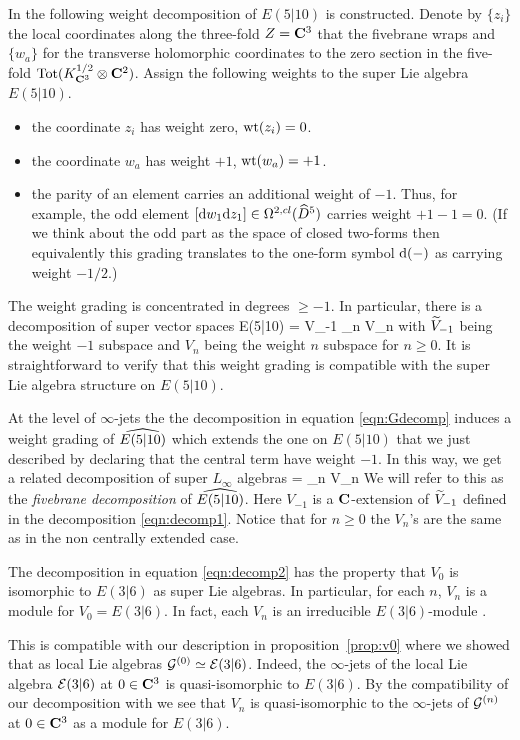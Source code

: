In \cite{KR2} the following weight decomposition of $E(5|10)$ is constructed.
Denote by $\{z_i\}$ the local coordinates along the three-fold $Z=\C^3$ that the fivebrane wraps and $\{w_a\}$ for the transverse holomorphic coordinates to the zero section in the five-fold ${\rm Tot}(K_{\C^3}^{1/2} \otimes \C^2)$.
Assign the following weights to the super Lie algebra $E(5|10)$. 
\begin{itemize} 
\item the coordinate $z_i$ has weight zero, $\wt(z_i) = 0$. 
\item the coordinate $w_a$ has weight $+1$, $\wt(w_a) = +1$. 
\item the parity of an element carries an additional weight of $-1$. 
Thus, for example, the odd element $[\d w_1 \d z_1] \in \Omega^{2,cl}(\Hat{D}^5)$ carries weight $+1 - 1 = 0$. 
(If we think about the odd part as the space of closed two-forms then equivalently this grading translates to the one-form symbol $\d(-)$ as carrying weight $-1/2$.)
\end{itemize} 
The weight grading is concentrated in degrees $\geq -1$. 
In particular, there is a decomposition of super vector spaces
\beqn\label{eqn:decomp1}
E(5|10) = \til V_{-1} \times \prod_{n } V_n 
\eeqn
with $\til V_{-1}$ being the weight $-1$ subspace and $V_n$ being the weight $n$ subspace for $n \geq 0$.  
It is straightforward to verify that this weight grading is compatible with the super Lie algebra structure on $E(5|10)$.


At the level of $\infty$-jets the the decomposition in equation \eqref{eqn:Gdecomp} induces a weight grading of $\Hat{E(5|10)}$ which extends the one on $E(5|10)$ that we just described by declaring that the central term have weight $-1$.
In this way, we get a related decomposition of super $L_\infty$ algebras
\beqn\label{eqn:decomp2}
 = \prod_{n } V_n
\eeqn
We will refer to this as the \textit{fivebrane decomposition} of $\Hat{E(5|10)}$.
Here $V_{-1}$ is a $\C$-extension of $\til V_{-1}$ defined in the decomposition \eqref{eqn:decomp1}.
Notice that for $n \geq 0$ the $V_n$'s are the same as in the non centrally extended case.

The decomposition in equation \eqref{eqn:decomp2} has the property that $V_0$ is isomorphic to $E(3|6)$ as super Lie algebras.
In particular, for each $n$, $V_n$ is a module for $V_0 = E(3|6)$.
In fact, each $V_n$ is an irreducible $E(3|6)$-module \cite{KR2}.

This is compatible with our description in proposition~\ref{prop:v0} where we showed that as local Lie algebras $\cG^{(0)} \simeq \cE(3|6)$. 
Indeed, the $\infty$-jets of the local Lie algebra $\cE(3|6)$ at $0 \in \C^3$ is quasi-isomorphic to $E(3|6)$. 
By the compatibility of our decomposition with \cite{KR2} we see that $V_n$ is quasi-isomorphic to the $\infty$-jets of $\cG^{(n)}$ at $0 \in \C^3$ as a module for $E(3|6)$.

